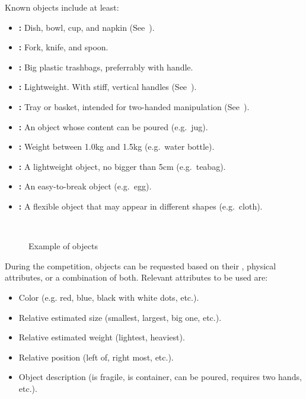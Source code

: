 Known objects include at least:
\begin{itemize}
	\item \textbf{:} Dish, bowl, cup, and napkin (See~).
	\item \textbf{:} Fork, knife, and spoon.
	\item \textbf{:} Big plastic trashbags, preferrably with handle.
	\item \textbf{:} Lightweight. With stiff, vertical handles (See~).
	\item \textbf{:} Tray or basket, intended for two-handed manipulation (See~).
	\item \textbf{:} An object whose content can be poured (e.g.~jug).
	\item \textbf{:} Weight between 1.0kg and 1.5kg (e.g.~water bottle).
	\item \textbf{:} A lightweight object, no bigger than 5cm (e.g.~teabag).
	\item \textbf{:} An easy-to-break object (e.g.~egg).
	\item \textbf{:} A flexible object that may appear in different shapes (e.g.~cloth).
\end{itemize}

\begin{figure}[H]
	\centering
	~
	~
	\caption{Example of objects}
	\label{fig:scenario_containers}
\end{figure}

\noindent During the competition, objects can be requested based on their \ObjectCategory{}, physical attributes, or a combination of both.
Relevant attributes to be used are:
\begin{itemize}
	\item Color (e.g. red, blue, black with white dots, etc.).
	\item Relative estimated size (smallest, largest, big one, etc.).
	\item Relative estimated weight (lightest, heaviest).
	\item Relative position (left of, right most, etc.).
	\item Object description (is fragile, is container, can be poured, requires two hands, etc.).
\end{itemize}

